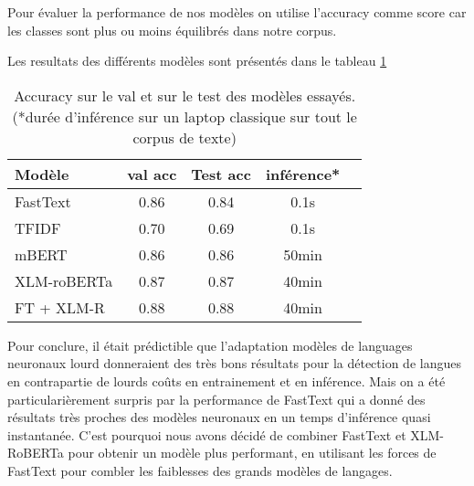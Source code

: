 
Pour évaluer la performance de nos modèles on utilise l'accuracy comme score car les classes sont plus ou moins équilibrés dans notre corpus.

Les resultats des différents modèles sont présentés dans le tableau \ref{tab:results}

\begin{table}[ht]
    \centering
    \begin{tabular}{lcccc}
        \toprule
        Modèle & val acc & Test acc  & inférence* \\
        \midrule
        FastText & 0.86 & 0.84 & 0.1s \\
        TFIDF & 0.70 & 0.69 & 0.1s \\
        mBERT & 0.86 & 0.86 & 50min \\
        XLM-roBERTa & 0.87 & 0.87 & 40min \\
        FT + XLM-R & 0.88 & 0.88 & 40min \\
        \bottomrule
    \end{tabular}

    \caption{Accuracy sur le val et sur le test des modèles essayés. (*durée d'inférence sur un laptop classique sur tout le corpus de texte)}
    
    \label{tab:results}
\end{table}

Pour conclure, il était prédictible que l'adaptation modèles de languages neuronaux lourd donneraient des très bons résultats pour la détection de langues en contrapartie de lourds coûts en entrainement et en inférence. Mais on a été particularièrement surpris par la performance de FastText qui a donné des résultats très proches des modèles neuronaux en un temps d'inférence quasi instantanée. C'est pourquoi nous avons décidé de combiner FastText et XLM-RoBERTa pour obtenir un modèle plus performant, en utilisant les forces de FastText pour combler les faiblesses des grands modèles de langages.